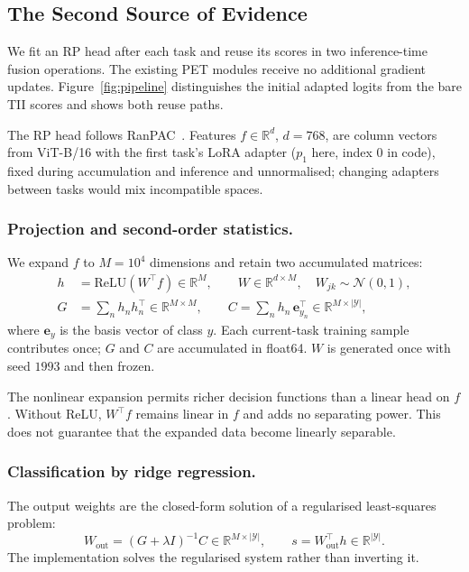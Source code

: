 \documentclass[runningheads]{llncs}
\begin{document}
\subsection{The Second Source of Evidence}
\label{sec:rp}

We fit an RP head after each task and reuse its scores in two inference-time
fusion operations. The existing PET modules receive no additional gradient updates.
Figure~\ref{fig:pipeline} distinguishes the initial adapted logits from the
bare TII scores and shows both reuse paths.

The RP head follows RanPAC~\cite{ref_ranpac}. Features $f\in\mathbb R^d$,
$d=768$, are column vectors from ViT-B/16 with the first task's LoRA adapter
($p_1$ here, index $0$ in code), fixed during accumulation and inference and
unnormalised; changing adapters between tasks would mix incompatible spaces.

\subsubsection{Projection and second-order statistics.}
We expand $f$ to $M=10^4$ dimensions and retain two accumulated matrices:
\begin{align}
h &= \mathrm{ReLU}(W^\top f) \in \mathbb{R}^{M},
\qquad W \in \mathbb{R}^{d \times M},\quad W_{jk}\sim\mathcal N(0,1),
\label{eq:proj}\\
G &= \sum_n h_n h_n^{\top} \in \mathbb{R}^{M \times M},
\qquad
C = \sum_n h_n\, \mathbf{e}_{y_n}^{\top}
   \in \mathbb{R}^{M \times |\mathcal{Y}|},
\label{eq:gram}
\end{align}
where $\mathbf{e}_{y}$ is the basis vector of class $y$. Each current-task
training sample contributes once; $G$ and $C$ are accumulated in float64.
$W$ is generated once with seed $1993$ and then frozen.

The nonlinear expansion permits richer decision functions than a linear head
on $f$. Without ReLU, $W^\top f$ remains linear in $f$ and adds no separating
power. This does not guarantee that the expanded data become linearly separable.

\subsubsection{Classification by ridge regression.}
The output weights are the closed-form solution of a regularised least-squares
problem:
\begin{equation}
W_{\mathrm{out}} = (G + \lambda I)^{-1} C \in \mathbb{R}^{M \times |\mathcal{Y}|},
\qquad
s = W_{\mathrm{out}}^{\top} h \in \mathbb{R}^{|\mathcal{Y}|} .
\label{eq:ridge}
\end{equation}
The implementation solves the regularised system rather than inverting it.
\end{document}

